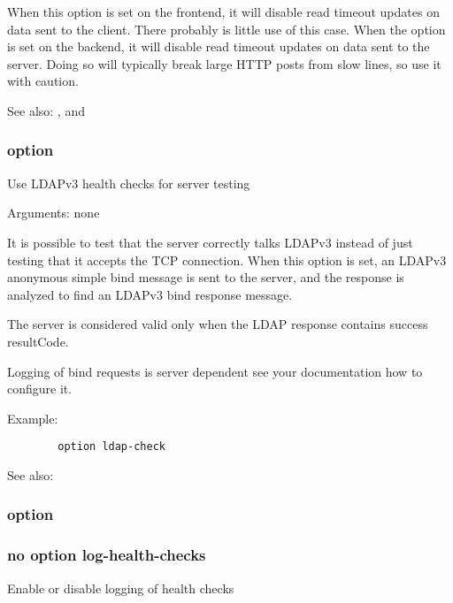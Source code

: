 {  When this option is set on the frontend, it will disable read timeout updates
  on data sent to the client. There probably is little use of this case. When
  the option is set on the backend, it will disable read timeout updates on
  data sent to the server. Doing so will typically break large HTTP posts from
  slow lines, so use it with caution.

  See also: ,  and 

\subsubsection[ldap-check]{option }


  Use LDAPv3 health checks for server testing


  Arguments: none

  It is possible to test that the server correctly talks LDAPv3 instead of just
  testing that it accepts the TCP connection. When this option is set, an
  LDAPv3 anonymous simple bind message is sent to the server, and the response
  is analyzed to find an LDAPv3 bind response message.

  The server is considered valid only when the LDAP response contains success resultCode.
  

  Logging of bind requests is server dependent see your documentation how to
  configure it.

  Example:
\begin{verbatim}
        option ldap-check
\end{verbatim}

  See also: 


\subsubsection{option }
\subsubsection*{no option log-health-checks}


  Enable or disable logging of health checks

}
